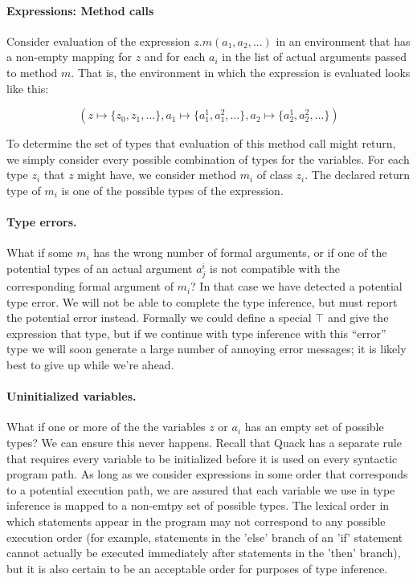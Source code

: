\documentclass[11pt]{article}
\begin{document}
\paragraph{Expressions: Method calls}

Consider evaluation of the expression \( z.m(a_1, a_2, ... )\) in an
environment that has a non-empty mapping for $z$ and for each $a_i$ in
the list of actual arguments passed to method $m$.  That is, the
environment in which the expression is evaluated looks like this: 

\[ ( z \mapsto \{ z_0, z_1, \ldots \}, 
     a_1 \mapsto \{ a^1_1, a^2_1, \ldots \}, 
     a_2 \mapsto \{ a^1_2, a^2_2, \ldots \} ) \]

To determine the set of types that evaluation of this method call
might return, we simply consider every possible combination of types
for the variables. For each type \(z_i\) that \(z\) might have, we 
consider method \(m_i\) of class \(z_i\).   The declared return type
of \( m_i\) is one of the possible types of the expression.

\paragraph{Type errors.}
What if some \(m_i\) has the wrong number of formal arguments, or if
one of the potential types of an actual argument \(a^i_j\) is not
compatible with the corresponding formal argument of \(m_i\)?  In that
case we have detected a potential type error.  We will not be able to
complete the type inference, but must report the potential error
instead.  Formally we could define a special \( \top \) and give the
expression that type, but if we continue with type inference with this
``error'' type we will soon generate a large number of annoying error
messages; it is likely best to give up while we're ahead.  

\paragraph{Uninitialized variables.}
What if one or more of the the variables $z$ or $a_i$ has an empty set
of possible types?  We can ensure this never happens.  Recall that
Quack has a separate rule that requires every variable to be 
initialized before it is used  on every syntactic program path.  As
long as we consider expressions in some order that corresponds to a
potential execution path, we are assured that each variable we use in
type inference is mapped to a non-emtpy set of possible types.  The
lexical order in which statements appear in the program may not
correspond to any possible execution order  (for example, statements
in the 'else' branch of an 'if' statement cannot actually be executed 
immediately after statements in the 'then' branch), but it is also certain to
be an acceptable order for purposes of type inference.  
\end{document}

